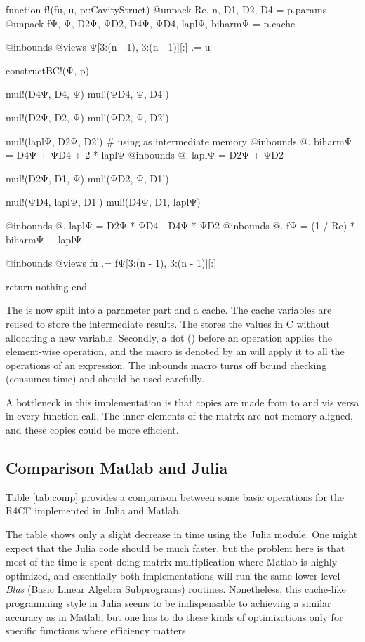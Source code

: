\begin{jllisting}[caption=Optimized implementation in Julia of the nonlinear function $F$]
function f!(fu, u, p::CavityStruct)
    @unpack Re, n, D1, D2, D4 = p.params
    @unpack fΨ, Ψ, D2Ψ, ΨD2, D4Ψ, ΨD4, laplΨ, biharmΨ = p.cache

    @inbounds @views Ψ[3:(n - 1), 3:(n - 1)][:] .= u

    constructBC!(Ψ, p)

    mul!(D4Ψ, D4, Ψ)
    mul!(ΨD4, Ψ, D4')

    mul!(D2Ψ, D2, Ψ)
    mul!(ΨD2, Ψ, D2')

    mul!(laplΨ, D2Ψ, D2') # using as intermediate memory
    @inbounds @. biharmΨ = D4Ψ + ΨD4 + 2 * laplΨ
    @inbounds @. laplΨ = D2Ψ + ΨD2

    mul!(D2Ψ, D1, Ψ)
    mul!(ΨD2, Ψ, D1')

    mul!(ΨD4, laplΨ, D1')
    mul!(D4Ψ, D1, laplΨ)

    @inbounds @. laplΨ = D2Ψ * ΨD4 - D4Ψ * ΨD2
    @inbounds @. fΨ = (1 / Re) * biharmΨ + laplΨ

    @inbounds @views fu .= fΨ[3:(n - 1), 3:(n - 1)][:]

    return nothing
end
\end{jllisting}

The  is now split into a parameter part and a cache.
The cache variables are reused to store the intermediate results. The
 stores the values in C without allocating a new variable.
Secondly, a dot () before an operation applies the element-wise
operation, and the macro is denoted by an  will apply it to all the
operations of an expression. The  inbounds macro turns off bound
checking (consumes time) and should be used carefully.

A bottleneck in this implementation is that copies are made from  to
 and vis versa in every function call. The inner elements of the
matrix  are not memory aligned, and these copies could be more
efficient.

\subsection{Comparison Matlab and Julia}

Table \ref{tab:comp} provides a comparison between some basic operations for the
R4CF implemented in Julia and Matlab. 

The table shows only a slight decrease in time using the Julia module. One
might expect that the Julia code should be much faster, but the problem here is
that most of the time is spent doing matrix multiplication where Matlab is
highly optimized, and essentially both implementations will run the same lower
level \emph{Blas} (Basic Linear Algebra Subprograms) routines. Nonetheless,
this cache-like programming style in Julia seems to be indispensable to
achieving a similar accuracy as in Matlab, but one has to do these kinds of
optimizations only for specific functions where efficiency matters.

